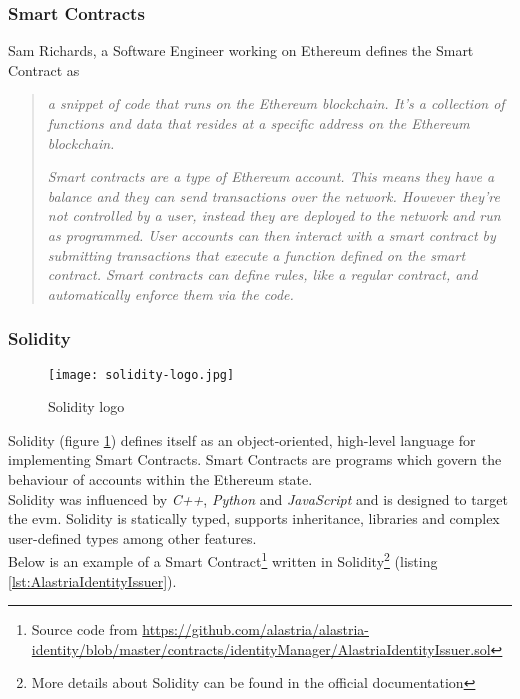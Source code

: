 \subsubsection{Smart Contracts}
Sam Richards\cite{smartContracts}, a Software Engineer working on Ethereum defines the Smart Contract as
\begin{quote}
    \textit{a snippet of code that runs on the Ethereum blockchain. It's a collection of functions and data that resides at a specific address on the Ethereum blockchain.}

    \textit{Smart contracts are a type of Ethereum account. This means they have a balance and they can send transactions over the network. However they're not controlled by a user, instead they are deployed to the network and run as programmed. User accounts can then interact with a smart contract by submitting transactions that execute a function defined on the smart contract. Smart contracts can define rules, like a regular contract, and automatically enforce them via the code.}
\end{quote}

\subsubsection{Solidity}
\begin{figure}[h]
    \centering
    \texttt{[image: solidity-logo.jpg]}
    \caption{Solidity logo}
    \label{fig:solidity_logo}
\end{figure}

Solidity (figure \ref{fig:solidity_logo}) defines itself as an object-oriented, high-level language for implementing Smart Contracts. Smart Contracts are programs which govern the behaviour of accounts within the Ethereum state.\\

Solidity\cite{solidityGit} was influenced by \textit{C++}, \textit{Python} and \textit{JavaScript} and is designed to target the \acrfull{evm}. Solidity is statically typed, supports inheritance, libraries and complex user-defined types among other features.\\

Below is an example of a Smart Contract\footnote{Source code from \url{https://github.com/alastria/alastria-identity/blob/master/contracts/identityManager/AlastriaIdentityIssuer.sol}} written in Solidity\footnote{More details about Solidity can be found in the official documentation\cite{solidity}} (listing  \ref{lst:AlastriaIdentityIssuer}).

